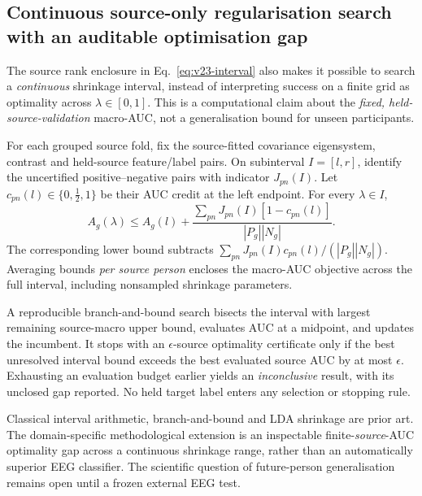 \subsection{Continuous source-only regularisation search with an auditable optimisation gap}
\label{sec:v23-continuous-search}
The source rank enclosure in Eq.~\eqref{eq:v23-interval} also
makes it possible to search a \emph{continuous} shrinkage interval,
instead of interpreting success on a finite grid as
optimality across $\lambda\in[0,1]$.
This is a computational claim about the \emph{fixed,
held-source-validation} macro-AUC, not a generalisation bound
for unseen participants.

For each grouped source fold, fix the source-fitted
covariance eigensystem, contrast and held-source feature/label
pairs. On subinterval $I=[l,r]$, identify the uncertified
positive--negative pairs with indicator $J_{pn}(I)$.
Let $c_{pn}(l)\in\{0,\tfrac12,1\}$ be their AUC credit
at the left endpoint. For every $\lambda\in I$,
\begin{equation}
 A_g(\lambda)\le A_g(l)+
 \frac{\sum_{pn}J_{pn}(I)[1-c_{pn}(l)]}{|P_g||N_g|}.
 \label{eq:v23-one-sided-auc-upper}
\end{equation}
The corresponding lower bound subtracts
$\sum_{pn}J_{pn}(I)c_{pn}(l)/(|P_g||N_g|)$.
Averaging bounds \emph{per source person} encloses
the macro-AUC objective across the full interval,
including nonsampled shrinkage parameters.

A reproducible branch-and-bound search bisects
the interval with largest remaining source-macro upper
bound, evaluates AUC at a midpoint, and updates the
incumbent. It stops with an $\epsilon$-source
optimality certificate only if the best unresolved
interval bound exceeds the best evaluated source AUC
by at most $\epsilon$. Exhausting an evaluation
budget earlier yields an \emph{inconclusive} result,
with its unclosed gap reported.
No held target label enters any selection or stopping rule.

Classical interval arithmetic, branch-and-bound and LDA
shrinkage are prior art. The domain-specific methodological
extension is an inspectable finite-\emph{source}-AUC
optimality gap across a continuous shrinkage range,
rather than an automatically superior EEG classifier.
The scientific question of future-person generalisation
remains open until a frozen external EEG test.
